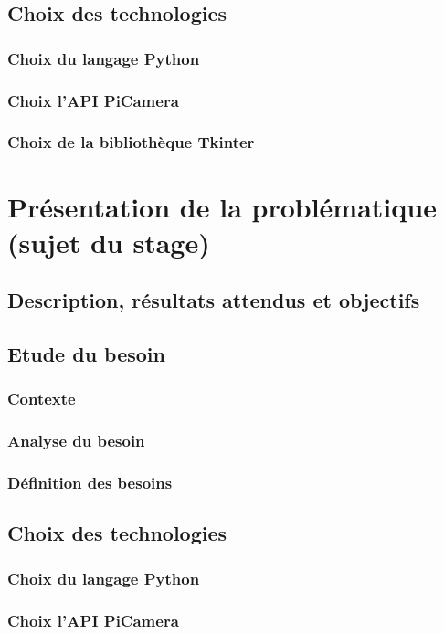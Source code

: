 \documentclass[a4paper, 11pt]{report}
\begin{document}
    \section{Choix des technologies}
        \subsection{Choix du langage Python}
        \subsection{Choix l'API PiCamera}
        \subsection{Choix de la bibliothèque Tkinter}

\chapter{Présentation de la problématique (sujet du stage)}
\minitoc

    \section{Description, résultats attendus et objectifs}
    \section{Etude du besoin}
        \subsection{Contexte}
        \subsection{Analyse du besoin}
        \subsection{Définition des besoins}
        
    \section{Choix des technologies}
        \subsection{Choix du langage Python}
        \subsection{Choix l'API PiCamera}
\end{document}
